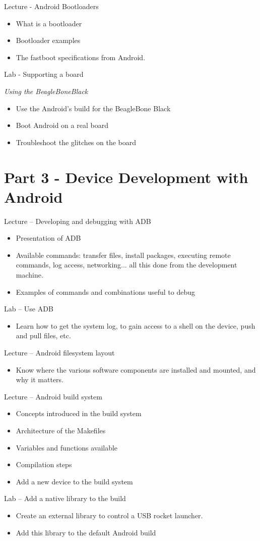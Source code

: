 \documentclass[a4paper,12pt,obeyspaces,spaces,hyphens]{article}
\begin{document}
\feagendatwocolumn
{Lecture - Android Bootloaders}
{
  \begin{itemize}
  \item What is a bootloader
  \item Bootloader examples
  \item The fastboot specifications from Android.
  \end{itemize}
}
{Lab - Supporting a board}
{
  {\em Using the BeagleBoneBlack}
  \begin{itemize}
  \item Use the Android's build for the BeagleBone Black
  \item Boot Android on a real board
  \item Troubleshoot the glitches on the board
  \end{itemize}
}

\section{Part 3 - Device Development with Android}

\feagendatwocolumn
{Lecture – Developing and debugging with ADB}
{
  \begin{itemize}
  \item Presentation of ADB
  \item Available commands: transfer files,
    install packages, executing remote commands, log access,
    networking... all this done from the development machine.
  \item Examples of commands and combinations useful to debug
  \end{itemize}
}
{Lab – Use ADB}
{
  \begin{itemize}
  \item Learn how to get the system log, to gain access to a shell on
    the device, push and pull files, etc.
  \end{itemize}
}

\feagendaonecolumn
{Lecture – Android filesystem layout}
{
  \begin{itemize}
  \item Know where the various software components are installed and
    mounted, and why it matters.
  \end{itemize}
}

\feagendatwocolumn
{Lecture – Android build system}
{
  \begin{itemize}
  \item Concepts introduced in the build system
  \item Architecture of the Makefiles
  \item Variables and functions available
  \item Compilation steps
  \item Add a new device to the build system
  \end{itemize}
}
{Lab – Add a native library to the build}
{
  \begin{itemize}
  \item Create an external library to control a USB rocket launcher.
  \item Add this library to the default Android build
  \end{itemize}
}
\end{document}
